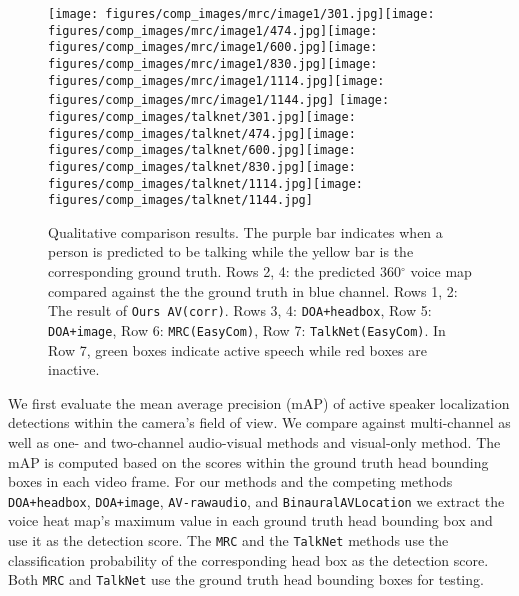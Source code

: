 \documentclass[10pt,twocolumn,letterpaper]{article}
\begin{document}
\begin{figure*}[tb]
\texttt{[image: figures/comp\_images/mrc/image1/301.jpg]}\texttt{[image: figures/comp\_images/mrc/image1/474.jpg]}\texttt{[image: figures/comp\_images/mrc/image1/600.jpg]}\texttt{[image: figures/comp\_images/mrc/image1/830.jpg]}\texttt{[image: figures/comp\_images/mrc/image1/1114.jpg]}\texttt{[image: figures/comp\_images/mrc/image1/1144.jpg]}\linebreak
\texttt{[image: figures/comp\_images/talknet/301.jpg]}\texttt{[image: figures/comp\_images/talknet/474.jpg]}\texttt{[image: figures/comp\_images/talknet/600.jpg]}\texttt{[image: figures/comp\_images/talknet/830.jpg]}\texttt{[image: figures/comp\_images/talknet/1114.jpg]}\texttt{[image: figures/comp\_images/talknet/1144.jpg]}\vspace{-5pt}
	\caption{ Qualitative comparison results. The purple bar indicates when a person is predicted
	to be talking while the yellow bar is the corresponding ground truth.
	Rows 2, 4: the predicted 360$^{\circ}$ voice map compared against the the ground truth in blue channel. 
	Rows 1, 2: The result of \texttt{Ours AV(corr)}. Rows 3, 4: \texttt{DOA+headbox}, Row 5: \texttt{DOA+image},   
	Row 6: \texttt{MRC(EasyCom)}, Row 7: \texttt{TalkNet(EasyCom)}. In Row 7, green boxes indicate active speech
	while red boxes are inactive.
	}
\vspace{-10pt}	
\label{fig:comparison}	
\end{figure*}


We first evaluate the mean average precision (mAP)
of active speaker localization detections
within the camera's field of view. We compare against multi-channel as well as one- and two-channel 
audio-visual methods and visual-only method.
The mAP is computed based on the scores
within the 
ground truth head bounding boxes in each video frame.
For our methods and the competing methods \texttt{DOA+headbox}, \texttt{DOA+image}, \texttt{AV-rawaudio}, and \texttt{BinauralAVLocation} 
we extract the voice heat map's maximum value in each ground truth head bounding box and use it 
as the detection score. The \texttt{MRC} and 
the \texttt{TalkNet} methods use the classification probability of the corresponding head box as the detection score. 
Both \texttt{MRC} and \texttt{TalkNet} use the ground truth head bounding boxes for testing. 
\end{document}
